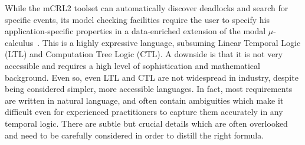 \documentclass[letter]{llncs}
\newcommand{\figshrink}{\vspace{-.6cm}}
\newcommand{\figshrinkend}{}
\begin{document}

While the mCRL2 toolset can automatically discover deadlocks and search
for specific events, its model checking facilities require the user to
specify his application-specific properties in a data-enriched extension
of the modal $\mu$-calculus~\cite{Groote05model-checkingprocesses}. 
This is a highly expressive language, subsuming Linear Temporal Logic
(LTL) and Computation Tree Logic (CTL). A downside is that
it is not very accessible and
requires a high level of sophistication and mathematical background.
Even so, even LTL and CTL are not widespread in industry, despite being
considered simpler, more accessible languages. In fact, most requirements
are written in natural language, and often contain ambiguities which
make it difficult even for experienced practitioners to capture them
accurately in any temporal logic. There are subtle but crucial details
which are often overlooked and need to be carefully considered in order
to distill the right formula.




\end{document}
